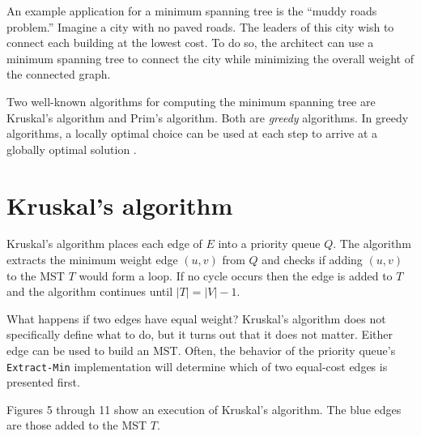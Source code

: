 \documentclass{book}
\begin{document}
An example application for a minimum spanning tree is the ``muddy roads problem.'' Imagine a city with no paved roads. The leaders of this city wish to connect each building at the lowest cost. To do so, the architect can use a minimum spanning tree to connect the city while minimizing the overall weight of the connected graph.

Two well-known algorithms for computing the minimum spanning tree are Kruskal's algorithm and Prim's algorithm. Both are \textit{greedy} algorithms. In greedy algorithms, a locally optimal choice can be used at each step to arrive at a globally optimal solution \cite{cormen2001introduction}.

\section{Kruskal's algorithm}

Kruskal's algorithm places each edge of $E$ into a priority queue $Q$. The algorithm extracts the minimum weight edge $(u,v)$ from $Q$ and checks if adding $(u,v)$ to the MST $T$ would form a loop. If no cycle occurs then the edge is added to $T$ and the algorithm continues until $|T|= |V|-1$.

What happens if two edges have equal weight? Kruskal's algorithm does not specifically define what to do, but it turns out that it does not matter. Either edge can be used to build an MST. Often, the behavior of the priority queue's \texttt{Extract-Min} implementation will determine which of two equal-cost edges is presented first.

Figures 5 through 11 show an execution of Kruskal's algorithm. The blue edges are those added to the MST $T$.
\end{document}
